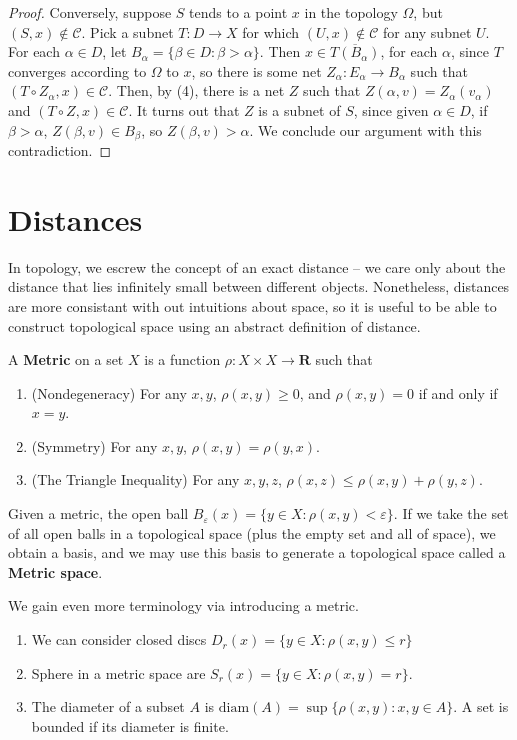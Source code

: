 \begin{proof}
    Conversely, suppose $S$ tends to a point $x$ in the topology $\Omega$, but $(S,x) \not \in \mathcal{C}$. Pick a subnet $T:D \to X$ for which $(U,x) \not \in \mathcal{C}$ for any subnet $U$. For each $\alpha \in D$, let $B_\alpha = \{ \beta \in D : \beta > \alpha \}$. Then $x \in \overline{T(B_\alpha)}$, for each $\alpha$, since $T$ converges according to $\Omega$ to $x$, so there is some net $Z_\alpha : E_\alpha \to B_\alpha$ such that $(T \circ Z_\alpha, x) \in \mathcal{C}$. Then, by (4), there is a net $Z$ such that $Z(\alpha, v) = Z_\alpha(v_\alpha)$ and $(T \circ Z,x) \in \mathcal{C}$. It turns out that $Z$ is a subnet of $S$, since given $\alpha \in D$, if $\beta > \alpha$, $Z(\beta, v) \in B_\beta$, so $Z(\beta, v) > \alpha$. We conclude our argument with this contradiction.
\end{proof}

\section{Distances}

In topology, we escrew the concept of an exact distance -- we care only about the distance that lies infinitely small between different objects. Nonetheless, distances are more consistant with out intuitions about space, so it is useful to be able to construct topological space using an abstract definition of distance.

\begin{definition}
    A {\bf Metric} on a set $X$ is a function $\rho: X \times X \to \mathbf{R}$ such that
    \begin{enumerate}
        \item (Nondegeneracy) For any $x,y$, $\rho(x,y) \geq 0$, and $\rho(x,y) = 0$ if and only if $x = y$.
        \item (Symmetry) For any $x,y$, $\rho(x,y) = \rho(y,x)$.
        \item (The Triangle Inequality) For any $x, y, z$, $\rho(x,z) \leq \rho(x,y) + \rho(y,z)$.
    \end{enumerate}
    Given a metric, the open ball $B_\varepsilon(x) = \{ y \in X : \rho(x,y) < \varepsilon \} $. If we take the set of all open balls in a topological space (plus the empty set and all of space), we obtain a basis, and we may use this basis to generate a topological space called a {\bf Metric space}.

    We gain even more terminology via introducing a metric.

    \begin{enumerate}
        \item We can consider closed discs $D_r(x) = \{ y \in X : \rho(x,y) \leq r \}$
        \item Sphere in a metric space are $S_r(x) = \{ y \in X : \rho(x,y) = r \}$.
        \item The diameter of a subset $A$ is $\text{diam}(A) = \sup \{ \rho(x,y): x,y \in A \}$. A set is bounded if its diameter is finite.
    \end{enumerate}
\end{definition}

